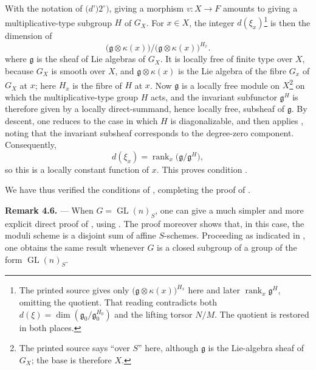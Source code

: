 With the notation of
{\(\textit{(d')}2^\circ\textit{)}\)}, giving a morphism \(v\colon
X\to F\) amounts to giving a multiplicative-type subgroup \(H\) of
\(G_X\).  For \(x\in X\), the integer \(d(\xi_x)\)\footnote{The printed source gives only
\(\bigl(\mathfrak g\otimes\kappa(x)\bigr)^{H_x}\) here and later
\(\operatorname{rank}_x\mathfrak g^H\), omitting the quotient.  That
reading contradicts both 
\(d(\xi)=\dim(\mathfrak g_0/\mathfrak g_0^{H_0})\) and the lifting
torsor \(N/M\).  The quotient is restored in both places.} is then
the dimension of
\[
  \bigl(\mathfrak g\otimes\kappa(x)\bigr)
  \big/
  \bigl(\mathfrak g\otimes\kappa(x)\bigr)^{H_x}.
\]
where \(\mathfrak g\) is the sheaf of Lie algebras of \(G_X\).  It
is locally free of finite type over \(X\), because \(G_X\) is smooth
over \(X\), and \(\mathfrak g\otimes\kappa(x)\) is the Lie algebra of
the fibre \(G_x\) of \(G_X\) at \(x\); here \(H_x\) is the fibre of
\(H\) at \(x\).  Now \(\mathfrak g\) is a locally free module on
\(X\)\footnote{The printed source says ``over \(S\)'' here, although
\(\mathfrak g\) is the Lie-algebra sheaf of \(G_X\); the base is
therefore \(X\).} on which the multiplicative-type group \(H\) acts, and the
invariant subfunctor \(\mathfrak g^H\) is therefore given by a
locally direct-summand, hence locally free, subsheaf of
\(\mathfrak g\).  By descent, one reduces to the case in which
\(H\) is diagonalizable, and then applies , noting
that the invariant subsheaf corresponds to the degree-zero
component.  Consequently,
\[
  d(\xi_x)=\operatorname{rank}_x
  \bigl(\mathfrak g/\mathfrak g^H\bigr),
\]
so this is a locally constant function of \(x\).  This proves
condition .

We have thus verified the conditions of
, completing the proof of
.

\medskip
\noindent{}\textbf{Remark 4.6.} ---
When \(G=\operatorname{GL}(n)_S\), one can give a much simpler and
more explicit direct proof of
, using .  The
proof moreover shows that, in this case, the moduli scheme is a
disjoint sum of affine \(S\)-schemes.  Proceeding as indicated in
, one obtains the same result
whenever \(G\) is a closed subgroup of a group of the form
\(\operatorname{GL}(n)_S\).

